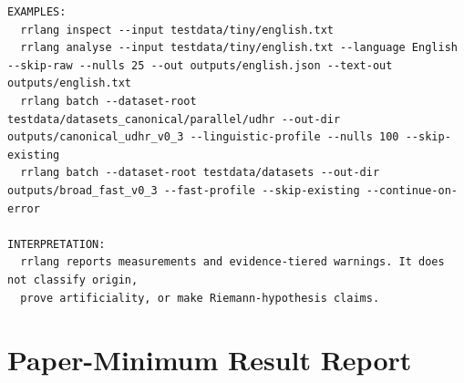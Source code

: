\documentclass[11pt,a4paper]{article}
\begin{document}
\begin{lstlisting}
EXAMPLES:
  rrlang inspect --input testdata/tiny/english.txt
  rrlang analyse --input testdata/tiny/english.txt --language English --skip-raw --nulls 25 --out outputs/english.json --text-out outputs/english.txt
  rrlang batch --dataset-root testdata/datasets_canonical/parallel/udhr --out-dir outputs/canonical_udhr_v0_3 --linguistic-profile --nulls 100 --skip-existing
  rrlang batch --dataset-root testdata/datasets --out-dir outputs/broad_fast_v0_3 --fast-profile --skip-existing --continue-on-error

INTERPRETATION:
  rrlang reports measurements and evidence-tiered warnings. It does not classify origin,
  prove artificiality, or make Riemann-hypothesis claims.
\end{lstlisting}


\section{Paper-Minimum Result Report}
\end{document}
